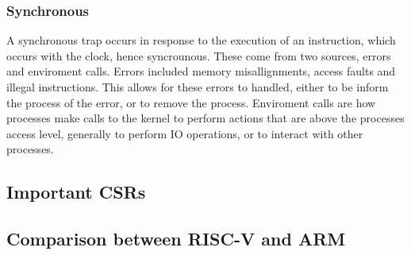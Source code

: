 \subsubsection{Synchronous}
A synchronous trap occurs in response to the execution of an instruction, which occurs with the clock, hence syncrounous. These come from two sources, errors and enviroment calls. Errors included memory misallignments, access faults and illegal instructions. This allows for these errors to handled, either to be inform the process of the error, or to remove the process. Enviroment calls are how processes make calls to the kernel to perform actions that are above the processes access level, generally to perform IO operations, or to interact with other processes.
\subsection{Important CSRs}
\subsection{Comparison between RISC-V and ARM}